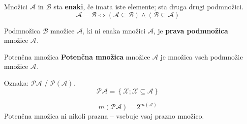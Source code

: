         \begin{frame}
            \begin{block}{}
                Množici $\mathcal{A}$ in $\mathcal{B}$ sta \textbf{enaki}, če imata iste elemente; 
                sta druga drugi podmnožici.
                $$\mathcal{A}=\mathcal{B}\Leftrightarrow(\mathcal{A}\subseteq\mathcal{B})\land(\mathcal{B}\subseteq\mathcal{A})$$
            \end{block}

            \begin{block}{}
                Podmnožica $\mathcal{B}$ množice $\mathcal{A}$, ki ni enaka množici $\mathcal{A}$, 
                je \textbf{prava podmnožica} množice $\mathcal{A}$.
            \end{block}

            \begin{alertblock}{Potenčna množica}
                \textbf{Potenčna množica} množice $\mathcal{A}$ je množica vseh podmnožic množice $\mathcal{A}$.
                
                Oznaka: $\mathbf{\mathcal{P}\mathcal{A}}$ / $\mathbf{\mathcal{P}(\mathcal{A})}$.
                $$ \mathcal{PA}=\left\{\mathcal{X}; \mathcal{X}\subseteq\mathcal{A} \right\}$$
            \end{alertblock}

            \begin{block}{}
                $$ m(\mathcal{PA})=2^{m(\mathcal{A})}$$
                Potenčna množica ni nikoli prazna -- vsebuje vsaj prazno množico.
            \end{block}
        \end{frame}